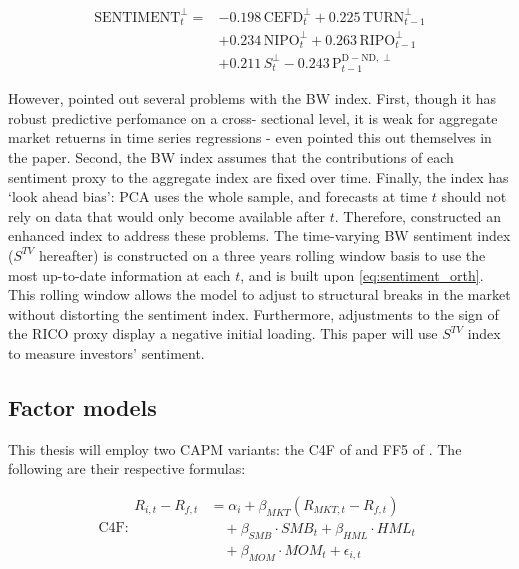 \begin{equation} %
    \label{eq:sentiment_orth}
    \begin{split}
    \text{SENTIMENT}^{\perp}_t = &-0.198\,\text{CEFD}^{\perp}_t + 0.225\,\text{TURN}^{\perp}_{t-1} \\
    &+ 0.234\,\text{NIPO}^{\perp}_t + 0.263\,\text{RIPO}^{\perp}_{t-1} \\
    &+ 0.211\,S^{\perp}_t - 0.243\,\text{P}^{\text{D} - \text{ND},\perp}_{t-1}
    \end{split}
\end{equation}

However,  pointed out several problems with the BW index. First, though it has robust predictive perfomance on a cross- sectional level, it is weak for aggregate market retuerns in time series regressions - even  pointed this out themselves in the paper. Second, the BW index assumes that the contributions of each sentiment proxy to the aggregate index are fixed over time. Finally, the index has `look ahead bias': PCA uses the whole sample, and forecasts at time $t$ should not rely on data that would only become available after $t$. Therefore,  constructed an enhanced index to address these problems. The time-varying BW sentiment index ($S^{TV}$ hereafter) is constructed on a three years rolling window basis to use the most up-to-date information at each $t$, and is built upon \cref{eq:sentiment_orth}. This rolling window allows the model to adjust to structural breaks in the market without distorting the sentiment index. Furthermore, adjustments to the sign of the RICO proxy display a negative initial loading. This paper will use  $S^{TV}$ index to measure investors' sentiment.


\subsection{Factor models}
This thesis will employ two CAPM variants: the C4F of  and FF5 of . The following are their respective formulas:


\begin{equation}
    \label{eq:c4f}
    \text{C4F:} 
    \begin{split}
        R_{i,t} - R_{f,t} &= \alpha_i + \beta_{MKT} (R_{MKT,t} - R_{f,t}) \\
        &\quad + \beta_{SMB} \cdot SMB_t + \beta_{HML} \cdot HML_t \\
        &\quad + \beta_{MOM} \cdot MOM_t + \epsilon_{i,t}
    \end{split}
\end{equation}


